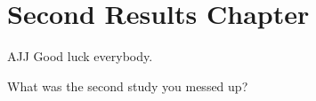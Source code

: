 \chapter{Second Results Chapter}
\label{chap:results_2}
\begin{chapquote}{AJJ}
Good luck everybody.
\end{chapquote}

What was the second study you messed up?
